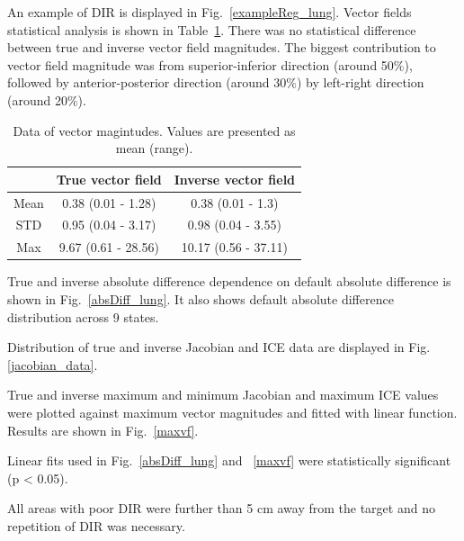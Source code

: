 \documentclass[type=dr, dr=rernat, accentcolor=tud7b,colorbacktitle, bigchapter, openright, twoside, 12pt ]{tudthesis}
\begin{document}
An example of DIR is displayed in Fig.~\ref{exampleReg_lung}. Vector fields statistical analysis is shown in Table~\ref{tab:vectordata_lung}. There was no statistical
difference between true and inverse vector field magnitudes. The biggest contribution to vector field magnitude was from superior-inferior direction (around 50\%), followed by anterior-posterior direction (around 30\%)
by left-right direction (around 20\%).

\begin{table}[H]
  \centering
  \caption{Data of vector magintudes. Values are presented as mean (range).}
  \begin{tabular}{c|c|c}
  
       & True vector field & Inverse vector field  \\
       \hline
       Mean & 0.38 (0.01 - 1.28) & 0.38 (0.01 - 1.3) \\ 
       STD & 0.95 (0.04 - 3.17) & 0.98 (0.04 - 3.55) \\ 
       Max & 9.67 (0.61 - 28.56) & 10.17 (0.56 - 37.11) \\
    \hline\hline
  \end{tabular}
  \label{tab:vectordata_lung}
\end{table}

True and inverse absolute difference dependence on default absolute difference is shown in Fig.~\ref{absDiff_lung}. It also shows default absolute difference distribution across 9 states. 

Distribution of true and inverse Jacobian and ICE data are displayed in Fig. \ref{jacobian_data}. 

True and inverse maximum and minimum Jacobian and maximum ICE values were plotted against maximum vector magnitudes and fitted with linear function. Results are shown in Fig.~\ref{maxvf}.


Linear fits used in Fig.~\ref{absDiff_lung} and ~\ref{maxvf} were statistically significant (p < 0.05).

All areas with poor DIR were further than 5 cm away from the target and no repetition of DIR was necessary.
\end{document}
